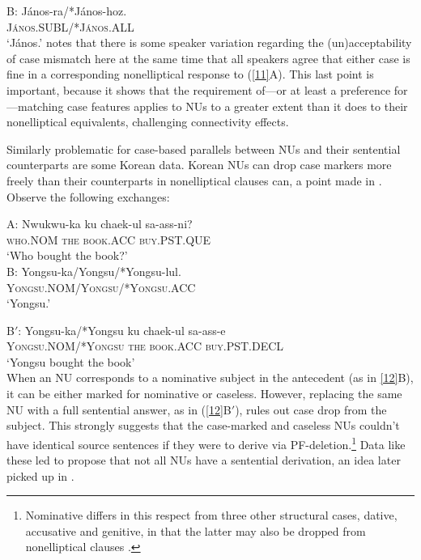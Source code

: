 \documentclass[output=paper
                ,modfonts
                ,nonflat
	        ,collection
	        ,collectionchapter
	        ,collectiontoclongg
 	        ,biblatex
                ,babelshorthands
                ,newtxmath
                ,draftmode
                ,colorlinks, citecolor=brown
]{./langsci/langscibook}
\begin{document}
{B: \gll J\'{a}nos-ra/*J\'{a}nos-hoz.\\
\textsc{J\'{a}nos.SUBL/*J\'{a}nos.ALL}\\
\glt  `J\'{a}nos.'\label{11}\z
\citet{Jacobson2016-in-cg} notes that there is some speaker variation regarding the (un)ac\-cepta\-bi\-li\-ty of case mismatch here at the same time that all speakers agree that either case is fine in a corresponding nonelliptical response to (\ref{11}A). This last point is important, because it shows that the requirement of---or at least a preference for---matching case features applies to NUs to a greater extent than it does to their nonelliptical equivalents, challenging connectivity effects.

Similarly problematic for case-based parallels between NUs and their sentential counterparts are some Korean data. Korean NUs can drop case markers more freely than their counterparts in nonelliptical clauses can, a point made in \citet{Morgan1989}. Observe the following exchanges:

  \ea
A: \gll Nwukwu-ka ku  chaek-ul  sa-ass-ni?\\
\textsc{who.NOM} \textsc{the} \textsc{book.ACC} \textsc{buy.PST.QUE}\\
\glt  `Who bought the book?'\\

B: \gll Yongsu-ka/Yongsu/*Yongsu-lul.\\
\textsc{Yongsu.NOM/Yongsu/*Yongsu.ACC}\\
\glt  `Yongsu.'

B$'$: \gll Yongsu-ka/*Yongsu  ku  chaek-ul  sa-ass-e\\
\textsc{Yongsu.NOM/*Yongsu} \textsc{the} \textsc{book.ACC} \textsc{buy.PST.DECL}\\
\glt  `Yongsu bought the book'\\
\label{12}\z
%
When an NU corresponds to a nominative subject in the antecedent (as in \ref{12}B), it can be either marked for nominative or caseless.
However, replacing the same NU with a full sentential answer, as in (\ref{12}B$'$), rules out case drop from the subject. This strongly suggests that the case-marked and caseless NUs couldn't have identical source sentences if they were to derive via PF-deletion.\footnote{Nominative differs in this respect from three other structural cases, dative, accusative and genitive, in that the latter may also be dropped from nonelliptical clauses \citep[see][]{Morgan1989, Lee2016, Kim2016}.}  Data like these led \citet{Morgan1989} to propose that not all NUs have a sentential derivation, an idea later picked up in \citet{Barton1998}.

}
\end{document}
